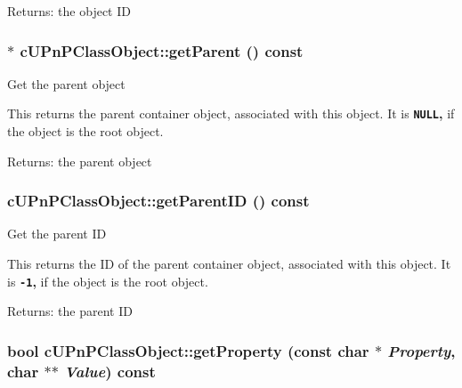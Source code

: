 \begin{Desc}
\item[Returns:]the object ID \end{Desc}
\hypertarget{classcUPnPClassObject_4787df89382fc962598fe4008a3eefd9}{
\subsubsection[{getParent}]{$\ast$ cUPnPClassObject::getParent () const}}
\label{classcUPnPClassObject_4787df89382fc962598fe4008a3eefd9}


Get the parent object

This returns the parent container object, associated with this object. It is {\bf {\tt NULL},} if the object is the root object.

\begin{Desc}
\item[Returns:]the parent object \end{Desc}
\hypertarget{classcUPnPClassObject_9eb008855499fc1afcd807cb019d7abe}{
\subsubsection[{getParentID}]{ cUPnPClassObject::getParentID () const}}
\label{classcUPnPClassObject_9eb008855499fc1afcd807cb019d7abe}


Get the parent ID

This returns the ID of the parent container object, associated with this object. It is {\bf {\tt -1},} if the object is the root object.

\begin{Desc}
\item[Returns:]the parent ID \end{Desc}
\hypertarget{classcUPnPClassObject_539cf36abc96b95bc8437601fed8a0f6}{
\subsubsection[{getProperty}]{\setlength{\rightskip}{0pt plus 5cm}bool cUPnPClassObject::getProperty (const char $\ast$ {\em Property}, \/  char $\ast$$\ast$ {\em Value}) const}}
\label{classcUPnPClassObject_539cf36abc96b95bc8437601fed8a0f6}


